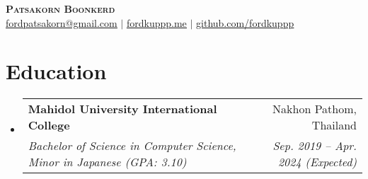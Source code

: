 \documentclass[letterpaper,11pt]{article}
\makeatletter
\newcommand{\resumeItem}[1]{
  \item\small{
    {#1 \vspace{-2pt}}
  }
}
\newcommand{\resumeSubheading}[4]{
  \vspace{-2pt}\item
    \begin{tabular*}{0.97\textwidth}[t]{l@{\extracolsep{\fill}}r}
      \textbf{#1} & #2 \\
      \textit{\small#3} & \textit{\small #4} \\
    \end{tabular*}\vspace{-7pt}
}
\newcommand{\resumeSubSubheading}[2]{
    \item
    \begin{tabular*}{0.97\textwidth}{l@{\extracolsep{\fill}}r}
      \textit{\small#1} & \textit{\small #2} \\
    \end{tabular*}\vspace{-7pt}
}
\newcommand{\resumeSubHeadingListStart}{\begin{itemize}[leftmargin=0.15in, label={}]}
\newcommand{\resumeSubHeadingListEnd}{\end{itemize}}
\newcommand{\resumeItemListStart}{\begin{itemize}}
\newcommand{\resumeItemListEnd}{\end{itemize}\vspace{-5pt}}
\makeatother
\begin{document}

\begin{center}
    \textbf{\Huge \scshape Patsakorn Boonkerd} \\ \vspace{1pt}
    \footnotesize{
       \href{mailto:fordpatsakorn@gmail.com}{\underline{fordpatsakorn@gmail.com}} $|$ 
       \href{https://fordkuppp.me/}{\underline{fordkuppp.me}} $|$ 
       \href{https://github.com/fordkuppp}{\underline{github.com/fordkuppp}}
    }
\end{center}


\section{Education}
  \resumeSubHeadingListStart
    \resumeSubheading
      {Mahidol University International College}{Nakhon Pathom, Thailand}
      {Bachelor of Science in Computer Science, Minor in Japanese (GPA: 3.10)}{Sep. 2019 -- Apr. 2024 (Expected)}
  \resumeSubHeadingListEnd



      
\end{document}
